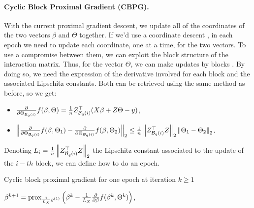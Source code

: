 \documentclass[a4]{article}
\begin{document}

\paragraph{Cyclic Block Proximal Gradient (CBPG).} With the current proximal gradient descent, we update all of the coordinates of
the two vectors $\beta$ and $\Theta$ together. If we'd use a coordinate descent \citep{Bascou_Lebre_Salmon20}, in each epoch we need to update each coordinate, one at a
time, for the two vectors. To use a compromise between them, we can exploit the block structure of the interaction matrix.
Thus, for the vector $\Theta$, we can make updates by blocks \citep{massias2019sparse,Beck17}. By doing so, we need the expression of the derivative involved for
each block and the associated Lipschitz constants.
Both can be retrieved using the same method as before, so we get:

\begin{itemize}
	\item $\frac{\partial}{\partial \Theta_{\mathcal{B}_{q}(i)}}f(\beta, \Theta) = \frac{1}{n} Z_{\mathcal{B}_{q}(i)}^\top (X\beta + Z\Theta - y)$,
	\item $\left \lVert \frac{\partial}{\partial \Theta_{\mathcal{B}_{q}(i)}}f(\beta, \Theta_1) - \frac{\partial}{\partial \Theta_{\mathcal{B}_{q}(i)}}f(\beta, \Theta_2) \right \rVert_2
	\leq \frac{1}{n}\left \lVert Z_{\mathcal{B}_{q}(i)}^\top Z \right \rVert_2 \left \lVert \Theta_1 - \Theta_2 \right \rVert_2$.
\end{itemize}

Denoting $L_i=\frac{1}{n}\left \lVert Z_{\mathcal{B}_{q}(i)}^\top Z \right \rVert_2$ the Lipschitz constant associated to the update of the $i-th$ block, we can define how to do an epoch.

\begin{algorithm}[H]
\label{algo:Algorithm_blockupdate}
\caption{Cyclic block proximal gradient for one epoch at iteration $k\geq 1$}

$\beta^{k+1} =  \operatorname{prox}_{\frac{1}{L_X}g^{(1)}}\left(\beta^k - \frac{1}{L_X}\frac{\partial}{\partial \beta}f(\beta^k, \Theta^k)\right)$,


\Output{$\beta, \Theta$}
\end{algorithm}
\end{document}
